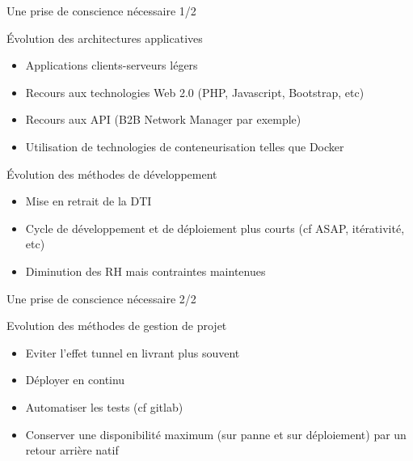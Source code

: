 \begin{frame}{Une prise de conscience nécessaire 1/2}
\begin{block}{Évolution des architectures applicatives}
\begin{itemize}
\item Applications clients-serveurs légers \pause
\item Recours aux technologies Web 2.0 (PHP, Javascript, Bootstrap, etc) \pause
\item Recours aux API (B2B Network Manager par exemple) \pause
\item Utilisation de technologies de conteneurisation telles que Docker \pause
\end{itemize}
\end{block}
\begin{block}{Évolution des méthodes de développement}
\begin{itemize}
\item Mise en retrait de la DTI \pause
\item Cycle de développement et de déploiement plus courts (cf ASAP, itérativité, etc) \pause
\item Diminution des RH mais contraintes maintenues  
\end{itemize}
\end{block}
\end{frame}

\begin{frame}{Une prise de conscience nécessaire 2/2}
\begin{block}{Evolution des méthodes de gestion de projet}
\begin{itemize}
\item Eviter l'effet tunnel en livrant plus souvent \pause
\item Déployer en continu \pause
\item Automatiser les tests (cf gitlab) \pause
\item Conserver une disponibilité maximum (sur panne et sur déploiement) par un retour arrière natif 
\end{itemize}
\end{block}
\end{frame}

